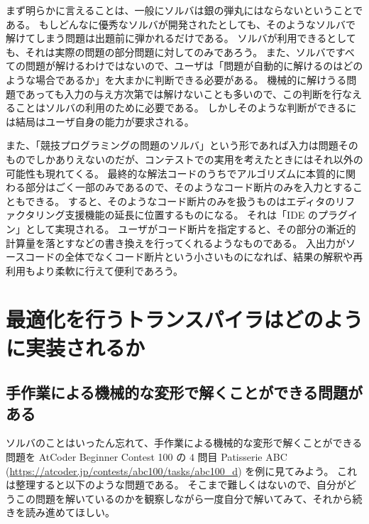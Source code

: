 \documentclass{ltjsarticle}
\begin{document}
まず明らかに言えることは、一般にソルバは銀の弾丸にはならないということである。
もしどんなに優秀なソルバが開発されたとしても、そのようなソルバで解けてしまう問題は出題前に弾かれるだけである。
ソルバが利用できるとしても、それは実際の問題の部分問題に対してのみであろう。
また、ソルバですべての問題が解けるわけではないので、ユーザは「問題が自動的に解けるのはどのような場合であるか」を大まかに判断できる必要がある。
機械的に解けうる問題であっても入力の与え方次第では解けないことも多いので、この判断を行なえることはソルバの利用のために必要である。
しかしそのような判断ができるには結局はユーザ自身の能力が要求される。

また、「競技プログラミングの問題のソルバ」という形であれば入力は問題そのものでしかありえないのだが、コンテストでの実用を考えたときにはそれ以外の可能性も現れてくる。
最終的な解法コードのうちでアルゴリズムに本質的に関わる部分はごく一部のみであるので、そのようなコード断片のみを入力とすることもできる。
すると、そのようなコード断片のみを扱うものはエディタのリファクタリング支援機能の延長に位置するものになる。
それは「IDE のプラグイン」として実現される。
ユーザがコード断片を指定すると、その部分の漸近的計算量を落とすなどの書き換えを行ってくれるようなものである。
入出力がソースコードの全体でなくコード断片という小さいものになれば、結果の解釈や再利用もより柔軟に行えて便利であろう。



\section{最適化を行うトランスパイラはどのように実装されるか}

\subsection{手作業による機械的な変形で解くことができる問題がある}\label{section:hand-solve}

ソルバのことはいったん忘れて、手作業による機械的な変形で解くことができる問題を AtCoder Beginner Contest 100 の $4$ 問目 Patisserie ABC (\url{https://atcoder.jp/contests/abc100/tasks/abc100_d}) を例に見てみよう。
これは整理すると以下のような問題である。
そこまで難しくはないので、自分がどうこの問題を解いているのかを観察しながら一度自分で解いてみて、それから続きを読み進めてほしい。
\end{document}
